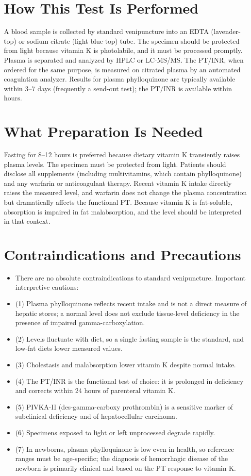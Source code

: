 \section*{How This Test Is Performed}
A blood sample is collected by standard venipuncture into an EDTA (lavender-top) or sodium citrate (light blue-top) tube. The specimen should be protected from light because vitamin K is photolabile, and it must be processed promptly. Plasma is separated and analyzed by HPLC or LC-MS/MS. The PT/INR, when ordered for the same purpose, is measured on citrated plasma by an automated coagulation analyzer. Results for plasma phylloquinone are typically available within 3--7 days (frequently a send-out test); the PT/INR is available within hours.

\section*{What Preparation Is Needed}
Fasting for 8--12 hours is preferred because dietary vitamin K transiently raises plasma levels. The specimen must be protected from light. Patients should disclose all supplements (including multivitamins, which contain phylloquinone) and any warfarin or anticoagulant therapy. Recent vitamin K intake directly raises the measured level, and warfarin does not change the plasma concentration but dramatically affects the functional PT. Because vitamin K is fat-soluble, absorption is impaired in fat malabsorption, and the level should be interpreted in that context.

\section*{Contraindications and Precautions}
\begin{itemize}
  \item There are no absolute contraindications to standard venipuncture. Important interpretive cautions:
  \item (1) Plasma phylloquinone reflects recent intake and is not a direct measure of hepatic stores; a normal level does not exclude tissue-level deficiency in the presence of impaired gamma-carboxylation.
  \item (2) Levels fluctuate with diet, so a single fasting sample is the standard, and low-fat diets lower measured values.
  \item (3) Cholestasis and malabsorption lower vitamin K despite normal intake.
  \item (4) The PT/INR is the functional test of choice: it is prolonged in deficiency and corrects within 24 hours of parenteral vitamin K.
  \item (5) PIVKA-II (des-gamma-carboxy prothrombin) is a sensitive marker of subclinical deficiency and of hepatocellular carcinoma.
  \item (6) Specimens exposed to light or left unprocessed degrade rapidly.
  \item (7) In newborns, plasma phylloquinone is low even in health, so reference ranges must be age-specific; the diagnosis of hemorrhagic disease of the newborn is primarily clinical and based on the PT response to vitamin K.
\end{itemize}
